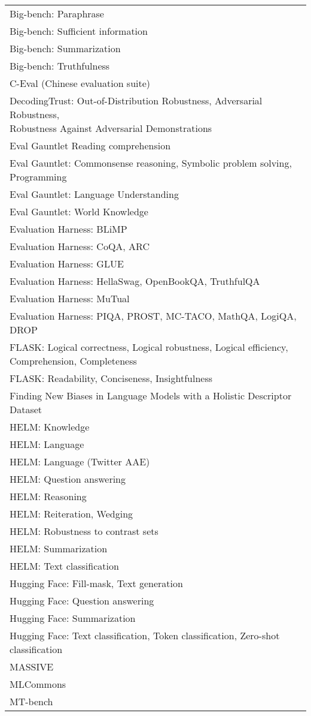 \documentclass[fleqn]{article}
\begin{document}
\begin{table}[H]
\begin{tabular}{l}
		Big-bench: Paraphrase \\
		Big-bench: Sufficient information \\
		Big-bench: Summarization \\
		Big-bench: Truthfulness \\
		C-Eval (Chinese evaluation suite) \\
		\makecell[l]{DecodingTrust: Out-of-Distribution Robustness, Adversarial Robustness,\\\hspace{10pt} Robustness Against Adversarial Demonstrations} \\
		Eval Gauntlet
		Reading comprehension \\
		Eval Gauntlet: Commonsense reasoning, Symbolic problem solving, Programming \\
		Eval Gauntlet: Language Understanding  \\
		Eval Gauntlet: World Knowledge \\
		Evaluation Harness: BLiMP \\
		Evaluation Harness: CoQA, ARC \\
		Evaluation Harness: GLUE \\
		Evaluation Harness: HellaSwag, OpenBookQA, TruthfulQA \\
		Evaluation Harness: MuTual \\
		Evaluation Harness: PIQA, PROST, MC-TACO, MathQA, LogiQA, DROP \\
		FLASK: Logical correctness, Logical robustness, Logical efficiency, Comprehension, Completeness \\
		FLASK: Readability, Conciseness, Insightfulness \\
		Finding New Biases in Language Models with a Holistic Descriptor Dataset \\
		HELM: Knowledge \\
		HELM: Language \\
		HELM: Language (Twitter AAE) \\
		HELM: Question answering \\
		HELM: Reasoning \\
		HELM: Reiteration, Wedging \\
		HELM: Robustness to contrast sets \\
		HELM: Summarization \\
		HELM: Text classification \\
		Hugging Face: Fill-mask, Text generation \\
		Hugging Face: Question answering \\
		Hugging Face: Summarization \\
		Hugging Face: Text classification, Token classification, Zero-shot classification \\
		MASSIVE \\
		MLCommons \\
		MT-bench \\
		\bottomrule
	\end{tabular}
\end{table}		
		
\end{document}
